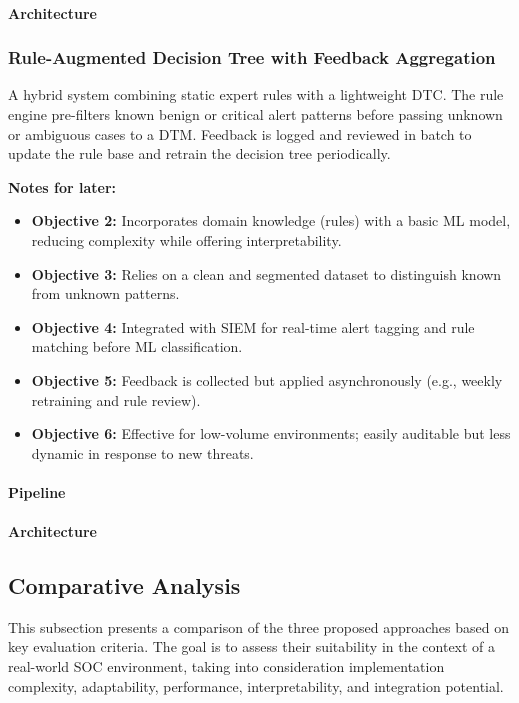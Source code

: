 \paragraph{Architecture}

\subsubsection{Rule-Augmented Decision Tree with Feedback Aggregation}
A hybrid system combining static expert rules with a lightweight \gls{DTC}. 
The rule engine pre-filters known benign or critical alert patterns before passing unknown or ambiguous cases to a \gls{DTM}. 
Feedback is logged and reviewed in batch to update the rule base and retrain the decision tree periodically.

\textbf{Notes for later:}
\begin{itemize}
    \item \textbf{Objective 2:} Incorporates domain knowledge (rules) with a basic \gls{ML} model, reducing complexity while offering interpretability.
    \item \textbf{Objective 3:} Relies on a clean and segmented dataset to distinguish known from unknown patterns.
    \item \textbf{Objective 4:} Integrated with \gls{SIEM} for real-time alert tagging and rule matching before \gls{ML} classification.
    \item \textbf{Objective 5:} Feedback is collected but applied asynchronously (e.g., weekly retraining and rule review).
    \item \textbf{Objective 6:} Effective for low-volume environments; easily auditable but less dynamic in response to new threats.
\end{itemize}

\paragraph{Pipeline}
\paragraph{Architecture}


\subsection{Comparative Analysis}
This subsection presents a comparison of the three proposed approaches based on key evaluation criteria. 
The goal is to assess their suitability in the context of a real-world SOC environment, taking into consideration implementation complexity, adaptability, performance, interpretability, and integration potential.

